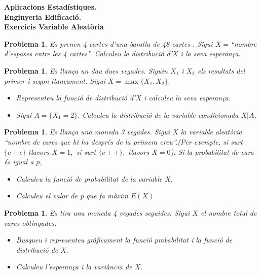 \documentclass[11pt]{article}
\newcounter{prbcont}
\newtheorem{problema}[prbcont]{Problema}
\newcommand{\sol}[1]{{\textbf{\footnotetext[\the\problemes]{Sol.: #1} }}}
\begin{document}
\begin{center}
\textbf{{\large {Aplicacions Estad\'{i}stiques.}\\Enginyeria Edificaci\'o.\\}}
\vspace{0.5cm}
\textbf{Exercicis Variable Aleat\`oria}
\end{center}



\begin{problema}
Es prenen 4 cartes d'una baralla de 48 cartes . Sigui $X=$``nombre
d'espases entre les 4 cartes''. Calculeu la distribuci\'o d'$X$ i la seva esperan\c{c}a.
\end{problema}

\begin{problema}
Es llan\c{c}a un dau dues vegades. Siguin $X_1$ i $X_2$ els resultats del primer i segon
llan\c{c}ament. Sigui $X = \max\{X_1,X_2\}.$
\begin{itemize}
\item [(a)] Representeu la funci\'o de distribuci\'o d'$X$ i calculeu la seva esperan\c{c}a.
\item [(b)] Sigui $A = \{X_1 = 2\}.$ Calculeu la distribuci\'o de la variable condicionada $X|A$.
\end{itemize}
\end{problema}


\begin{problema}
Es llan\c{c}a una moneda 3 vegades. Sigui $X$ la variable aleat\`oria ``nombre de cares que
hi ha despr\'es de la primera creu''.(Per exemple, si surt $\{c+c\}$ llavors $X=1,$ si surt
$\{c++\},$ llavors $X = 0$). Si la probabilitat de cara \'es igual a $p,$
\begin{itemize}
\item [(a)] Calculeu la funci\'o de probabilitat de la variable $X.$
\item [(b)] Calculeu el valor de p que fa m\`axim $E(X)$
\end{itemize}
\end{problema}

\begin{problema}
Es tira una moneda 4 vegades seguides. Sigui $X$ el nombre total de cares obtingudes.
\begin{itemize}
\item [(a)] Busqueu i representeu gr\`aficament la funci\'o probabilitat i la funci\'o de
distribuci\'o de $X.$
\item [(b)] Calculeu l'esperan\c{c}a i la vari\`ancia de $X.$ %
\end{itemize}
\end{problema}
\end{document}
